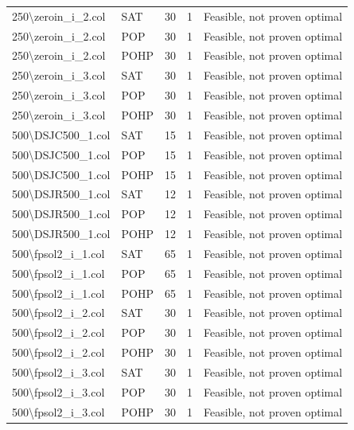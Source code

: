 \begin{longtable}{llrrl}
250\textbackslash{}zeroin\_i\_2.col & SAT & 30 & 1 & Feasible, not proven optimal \\
250\textbackslash{}zeroin\_i\_2.col & POP & 30 & 1 & Feasible, not proven optimal \\
250\textbackslash{}zeroin\_i\_2.col & POHP & 30 & 1 & Feasible, not proven optimal \\
250\textbackslash{}zeroin\_i\_3.col & SAT & 30 & 1 & Feasible, not proven optimal \\
250\textbackslash{}zeroin\_i\_3.col & POP & 30 & 1 & Feasible, not proven optimal \\
250\textbackslash{}zeroin\_i\_3.col & POHP & 30 & 1 & Feasible, not proven optimal \\
500\textbackslash{}DSJC500\_1.col & SAT & 15 & 1 & Feasible, not proven optimal \\
500\textbackslash{}DSJC500\_1.col & POP & 15 & 1 & Feasible, not proven optimal \\
500\textbackslash{}DSJC500\_1.col & POHP & 15 & 1 & Feasible, not proven optimal \\
500\textbackslash{}DSJR500\_1.col & SAT & 12 & 1 & Feasible, not proven optimal \\
500\textbackslash{}DSJR500\_1.col & POP & 12 & 1 & Feasible, not proven optimal \\
500\textbackslash{}DSJR500\_1.col & POHP & 12 & 1 & Feasible, not proven optimal \\
500\textbackslash{}fpsol2\_i\_1.col & SAT & 65 & 1 & Feasible, not proven optimal \\
500\textbackslash{}fpsol2\_i\_1.col & POP & 65 & 1 & Feasible, not proven optimal \\
500\textbackslash{}fpsol2\_i\_1.col & POHP & 65 & 1 & Feasible, not proven optimal \\
500\textbackslash{}fpsol2\_i\_2.col & SAT & 30 & 1 & Feasible, not proven optimal \\
500\textbackslash{}fpsol2\_i\_2.col & POP & 30 & 1 & Feasible, not proven optimal \\
500\textbackslash{}fpsol2\_i\_2.col & POHP & 30 & 1 & Feasible, not proven optimal \\
500\textbackslash{}fpsol2\_i\_3.col & SAT & 30 & 1 & Feasible, not proven optimal \\
500\textbackslash{}fpsol2\_i\_3.col & POP & 30 & 1 & Feasible, not proven optimal \\
500\textbackslash{}fpsol2\_i\_3.col & POHP & 30 & 1 & Feasible, not proven optimal \\

\end{longtable}
